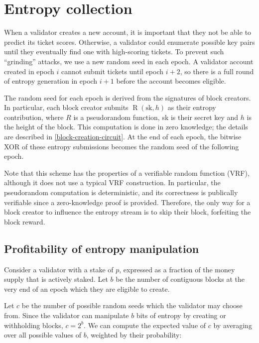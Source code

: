 \section{Entropy collection}
\label{entropy}

When a validator creates a new account, it is important that they not be able to predict its ticket scores. Otherwise, a validator could enumerate possible key pairs until they eventually find one with high-scoring tickets. To prevent such ``grinding'' attacks, we use a new random seed in each epoch. A validator account created in epoch $i$ cannot submit tickets until epoch $i + 2$, so there is a full round of entropy generation in epoch $i + 1$ before the account becomes eligible.

The random seed for each epoch is derived from the signatures of block creators. In particular, each block creator submits $\operatorname{R}(\mathrm{sk}, h)$ as their entropy contribution, where $R$ is a pseudorandom function, sk is their secret key and $h$ is the height of the block. This computation is done in zero knowledge; the details are described in \autoref{block-creation-circuit}. At the end of each epoch, the bitwise XOR of these entropy submissions becomes the random seed of the following epoch.

Note that this scheme has the properties of a verifiable random function (VRF), although it does not use a typical VRF construction. In particular, the pseudorandom computation is deterministic, and its correctness is publically verifiable since a zero-knowledge proof is provided. Therefore, the only way for a block creator to influence the entropy stream is to skip their block, forfeiting the block reward.

\subsection{Profitability of entropy manipulation}

Consider a validator with a stake of $p$, expressed as a fraction of the money supply that is actively staked. Let $b$ be the number of contiguous blocks at the very end of an epoch which they are eligible to create.

Let $c$ be the number of possible random seeds which the validator may choose from. Since the validator can manipulate $b$ bits of entropy by creating or withholding blocks, $c = 2^b$. We can compute the expected value of $c$ by averaging over all possible values of $b$, weighted by their probability:

